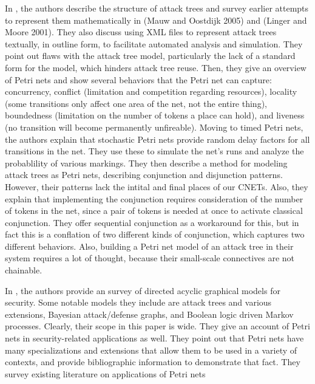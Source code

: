 In \cite{1652085}, the authors describe the structure of attack trees and survey earlier attempts to represent them mathematically in (Mauw and Oostdijk 2005) and (Linger and Moore 2001). They also discuss using XML files to represent attack trees textually, in outline form, to facilitate automated analysis and simulation. They point out flaws with the attack tree model, particularly the lack of a standard form for the model, which hinders attack tree reuse. Then, they give an overview of Petri nets and show several behaviors that the Petri net can capture: concurrency, conflict (limitation and competition regarding resources), locality (some transitions only affect one area of the net, not the entire thing), boundedness (limitation on the number of tokens a place can hold), and liveness (no transition will become permanently unfireable). Moving to timed Petri nets, the authors explain that stochastic Petri nets provide random delay factors for all transitions in the net. They use these to simulate the net's runs and analyze the probablility of various markings. They then describe a method for modeling attack trees as Petri nets, describing conjunction and disjunction patterns. However, their patterns lack the intital and final places of our CNETs. Also, they explain that implementing the conjunction requires consideration of the number of tokens in the net, since a pair of tokens is needed at once to activate classical conjunction. They offer sequential conjunction as a workaround for this, but in fact this is a conflation of two different kinds of conjunction, which captures two different behaviors. Also, building a Petri net model of an attack tree in their system requires a lot of thought, because their small-scale connectives are not chainable. 

In \cite{KORDY20141}, the authors provide an survey of directed acyclic graphical models for security. Some notable models they include are attack trees and various extensions, Bayesian attack/defense graphs, and Boolean logic driven Markov processes. Clearly, their scope in this paper is wide. They give an account of Petri nets in security-related applications as well. They point out that Petri nets have many specializations and extensions that allow them to be used in a variety of contexts, and provide bibliographic information to demonstrate that fact. They survey existing literature on applications of Petri nets


\nocite{*}




